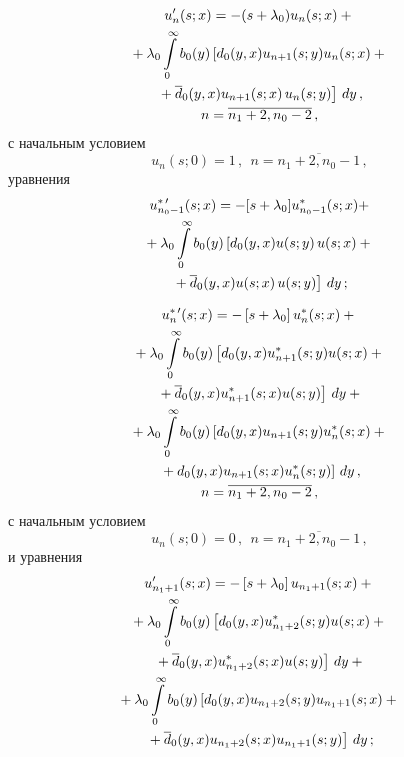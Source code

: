 \begin{multicols}{2}
\noindent
\begin{multline*}
u'_n(s;x) = - (s + \lambda_0) u_{n}(s;x) +{}
\\
{}+
\lambda_0 \int\limits_0^\infty b_0(y) \left[d_0(y,x) u_{n+1}(s;y) u_{n}(s;x)
+{}\right.\\
\left.{}+ \overline d_0(y,x) u_{n+1}(s;x)\, u_{n}(s;y)\right] \, dy\,,
\\ 
n=\overline{n_1+2,n_0-2}\,,
\end{multline*}
с начальным условием
$$
u_n(s;0)= 1 \,, \ \ n=\overline{n_1+2,n_0-1}\,,
$$
уравнения
\begin{multline}
\label{5-2-m}
u^{*\,\prime}_{n_0-1}(s;x) = - [s + \lambda_0] u^*_{n_0-1}(s;x)+
\\
{}+
\lambda_0 \int\limits_0^\infty b_0(y) \left[d_0(y,x)  u(s;y)\, u(s;x)+{}\right.\\
\left.{}+
\overline d_0(y,x) u(s;x)\, u(s;y)\right] \, dy\,;
\end{multline}

\vspace*{-12pt}

\noindent
\begin{multline}
\label{5-2-2-m}
u^{*\,\prime}_n(s;x) = - \left[s + \lambda_0\right] u^*_{n}(s;x) +{}
\\
{}+
\lambda_0 \int\limits_0^\infty b_0(y) \left[d_0(y,x) u^*_{n+1}(s;y) u(s;x)
+ {}\right.\\
\left.{}+\overline d_0(y,x) u^*_{n+1}(s;x) u(s;y)\right] \, dy
+{}\\
{}+ \lambda_0 \int\limits_0^\infty b_0(y) \left[d_0(y,x) u_{n+1}(s;y) u^*_{n}(s;x)
+ {}\right.\\
\left.{}+d_0(y,x) u_{n+1}(s;x) u^*_{n}(s;y)\right] \, dy\,,
\\  n=\overline{n_1+2,n_0-2}\,,
\end{multline}
с начальным условием
$$
u_n(s;0) = 0\,, \ \ n=\overline{n_1+2,n_0-1}\,,
$$
и уравнения
\begin{multline}
\label{5-2-3-m}
u'_{n_1+1}(s;x) = - \left[s + \lambda_0\right] u_{n_1+1}(s;x) +{}
\\
{}+
\lambda_0 \int\limits_0^\infty b_0(y) \left[d_0(y,x) u^*_{n_1+2}(s;y) u(s;x)+{}\right.\\
\left.{}+
\overline d_0(y,x) u^*_{n_1+2}(s;x) u(s;y)\right] \, dy+{}
\\
{}+ 
\lambda_0 \int\limits_0^\infty b_0(y) \left[d_0(y,x) u_{n_1+2}(s;y) u_{n_1+1}(s;x) +{}\right.\\
\left.{}+
\overline d_0(y,x) u_{n_1+2}(s;x) u_{n_1+1}(s;y)\right]\, dy\,;
\end{multline}


\end{multicols}
